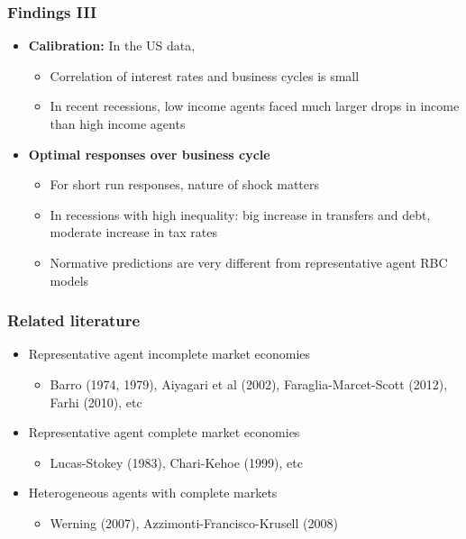 \documentclass{beamer}
\begin{document}
\begin{frame}%
\frametitle{Findings III}
\begin{itemize}
\item \textbf{Calibration:} In the US data,
\begin{itemize}
\item Correlation of interest rates and business cycles is small 
\item In recent recessions, low income agents faced much larger drops in income than high income agents
\end{itemize}

\item \textbf{Optimal responses over business cycle}
\begin{itemize}
\item For short run responses, nature of shock matters
\item  In recessions with high inequality:
big increase in transfers and debt, moderate increase in tax rates
\item Normative predictions are very different from representative agent RBC models
\end{itemize}
\end{itemize}
\end{frame}


\begin{frame}%

\frametitle{Related literature}

\begin{itemize}
\item Representative agent incomplete market economies

\begin{itemize}
\item Barro (1974, 1979), Aiyagari et al (2002), Faraglia-Marcet-Scott
(2012), Farhi (2010), etc
\end{itemize}

\item Representative agent complete market economies

\begin{itemize}
\item Lucas-Stokey (1983), Chari-Kehoe (1999), etc
\end{itemize}

\item Heterogeneous agents with complete markets

\begin{itemize}
\item Werning (2007), Azzimonti-Francisco-Krusell (2008)
\end{itemize}
\end{itemize}

\end{frame}%
\end{document}
